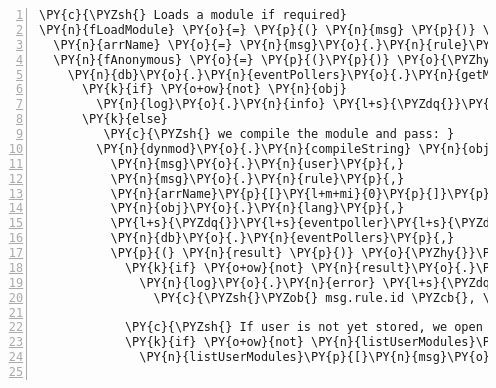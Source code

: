 \begin{Verbatim}[fontsize=\scriptsize,commandchars=\\\{\},numbers=left,firstnumber=1,stepnumber=1]
\PY{c}{\PYZsh{} Loads a module if required}
\PY{n}{fLoadModule} \PY{o}{=} \PY{p}{(} \PY{n}{msg} \PY{p}{)} \PY{o}{\PYZhy{}}\PY{o}{\PYZgt{}}
  \PY{n}{arrName} \PY{o}{=} \PY{n}{msg}\PY{o}{.}\PY{n}{rule}\PY{o}{.}\PY{n}{eventname}\PY{o}{.}\PY{n}{split} \PY{l+s}{\PYZsq{}}\PY{l+s}{ \PYZhy{}\PYZgt{} }\PY{l+s}{\PYZsq{}}
  \PY{n}{fAnonymous} \PY{o}{=} \PY{p}{(}\PY{p}{)} \PY{o}{\PYZhy{}}\PY{o}{\PYZgt{}}
    \PY{n}{db}\PY{o}{.}\PY{n}{eventPollers}\PY{o}{.}\PY{n}{getModule} \PY{n}{msg}\PY{o}{.}\PY{n}{user}\PY{p}{,} \PY{n}{arrName}\PY{p}{[} \PY{l+m+mi}{0} \PY{p}{]}\PY{p}{,} \PY{p}{(} \PY{n}{err}\PY{p}{,} \PY{n}{obj} \PY{p}{)} \PY{o}{\PYZhy{}}\PY{o}{\PYZgt{}}
      \PY{k}{if} \PY{o+ow}{not} \PY{n}{obj}
        \PY{n}{log}\PY{o}{.}\PY{n}{info} \PY{l+s}{\PYZdq{}}\PY{l+s}{EP | No module retrieved for \PYZsh{}\PYZob{} arrName[0] \PYZcb{}, must be a custom event or Webhook}\PY{l+s}{\PYZdq{}}
      \PY{k}{else}
         \PY{c}{\PYZsh{} we compile the module and pass: }
        \PY{n}{dynmod}\PY{o}{.}\PY{n}{compileString} \PY{n}{obj}\PY{o}{.}\PY{n}{data}\PY{p}{,}  \PY{c}{\PYZsh{} code}
          \PY{n}{msg}\PY{o}{.}\PY{n}{user}\PY{p}{,}                     \PY{c}{\PYZsh{} userId}
          \PY{n}{msg}\PY{o}{.}\PY{n}{rule}\PY{p}{,}                     \PY{c}{\PYZsh{} oRule}
          \PY{n}{arrName}\PY{p}{[}\PY{l+m+mi}{0}\PY{p}{]}\PY{p}{,}                   \PY{c}{\PYZsh{} moduleId}
          \PY{n}{obj}\PY{o}{.}\PY{n}{lang}\PY{p}{,}                     \PY{c}{\PYZsh{} script language}
          \PY{l+s}{\PYZdq{}}\PY{l+s}{eventpoller}\PY{l+s}{\PYZdq{}}\PY{p}{,}                \PY{c}{\PYZsh{} the module type}
          \PY{n}{db}\PY{o}{.}\PY{n}{eventPollers}\PY{p}{,}              \PY{c}{\PYZsh{} the DB interface}
          \PY{p}{(} \PY{n}{result} \PY{p}{)} \PY{o}{\PYZhy{}}\PY{o}{\PYZgt{}}
            \PY{k}{if} \PY{o+ow}{not} \PY{n}{result}\PY{o}{.}\PY{n}{answ} \PY{o+ow}{is} \PY{l+m+mi}{200}
              \PY{n}{log}\PY{o}{.}\PY{n}{error} \PY{l+s}{\PYZdq{}}\PY{l+s}{EP | Compilation of code failed! \PYZsh{}\PYZob{} msg.user \PYZcb{},}
                \PY{c}{\PYZsh{}\PYZob{} msg.rule.id \PYZcb{}, \PYZsh{}\PYZob{} arrName[0] \PYZcb{}\PYZdq{}}

            \PY{c}{\PYZsh{} If user is not yet stored, we open a new object}
            \PY{k}{if} \PY{o+ow}{not} \PY{n}{listUserModules}\PY{p}{[}\PY{n}{msg}\PY{o}{.}\PY{n}{user}\PY{p}{]}
              \PY{n}{listUserModules}\PY{p}{[}\PY{n}{msg}\PY{o}{.}\PY{n}{user}\PY{p}{]} \PY{o}{=} \PY{p}{\PYZob{}}\PY{p}{\PYZcb{}}


\end{Verbatim}
